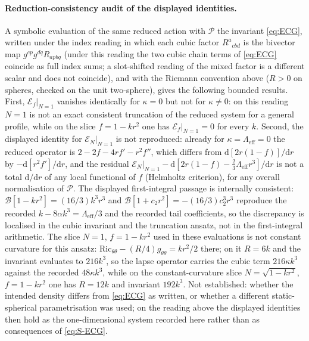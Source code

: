\paragraph{Reduction-consistency audit of the displayed identities.}
A symbolic evaluation of the same reduced action with \(\mathcal P\) the
invariant \eqref{eq:ECG}, written under the index reading in which each
cubic factor \(R^a{}_{cbd}\) is the bivector map \(g^{cp}g^{dq}R_{apbq}\)
(under this reading the two cubic chain terms of \eqref{eq:ECG} coincide
as full index sums; a slot-shifted reading of the mixed factor is a
different scalar and does not coincide), and with the Riemann convention
above (\(R>0\) on spheres, checked on the unit two-sphere), gives the
following bounded results. First, \(\left.\mathcal E_f\right|_{N=1}\)
vanishes identically for \(\kappa=0\) but not for \(\kappa\ne0\): on this
reading \(N=1\) is not an exact consistent truncation of the reduced
system for a general profile, while on the slice \(f=1-kr^2\) one has
\(\left.\mathcal E_f\right|_{N=1}=0\) for every \(k\). Second, the
displayed identity for \(\left.\mathcal E_N\right|_{N=1}\) is not
reproduced: already for \(\kappa=\Lambda_{\mathrm{eff}}=0\) the reduced
operator is \(2-2f-4rf'-r^2f''\), which differs from
\(\mathrm d[2r(1-f)]/\mathrm dr\) by \(-\mathrm d[r^2f']/\mathrm dr\),
and the residual
\(\left.\mathcal E_N\right|_{N=1}-\mathrm d[2r(1-f)-\tfrac23\Lambda_{\mathrm{eff}}r^3]/\mathrm dr\)
is not a total \(\mathrm d/\mathrm dr\) of any local functional of \(f\)
(Helmholtz criterion), for any overall normalisation of \(\mathcal P\).
The displayed first-integral passage is internally consistent:
\(\mathcal B[1-kr^2]=(16/3)k^3r^3\) and
\(\mathcal B[1+c_2r^2]=-(16/3)c_2^3r^3\) reproduce the recorded
\(k-8\alpha k^3=\Lambda_{\mathrm{eff}}/3\) and the recorded tail
coefficients, so the discrepancy is localised in the cubic invariant and
the truncation ansatz, not in the first-integral arithmetic. The slice
\(N=1\), \(f=1-kr^2\) used in these evaluations is not constant curvature
for this ansatz: \(\mathrm{Ric}_{\theta\theta}-(R/4)g_{\theta\theta}=kr^2/2\)
there; on it \(R=6k\) and the invariant evaluates to \(216k^3\), so the
lapse operator carries the cubic term \(216\kappa k^3\) against the
recorded \(48\kappa k^3\), while on the constant-curvature slice
\(N=\sqrt{1-kr^2}\), \(f=1-kr^2\) one has \(R=12k\) and invariant
\(192k^3\). Not established: whether the intended density differs from
\eqref{eq:ECG} as written, or whether a different static-spherical
parametrisation was used; on the reading above the displayed identities
then hold as the one-dimensional system recorded here rather than as
consequences of \eqref{eq:S-ECG}.
